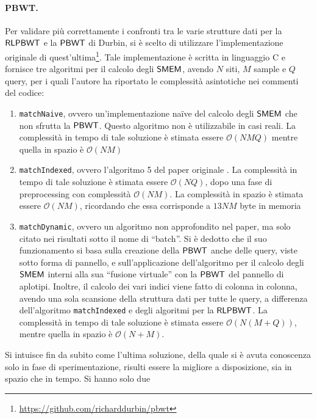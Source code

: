 \paragraph{PBWT.}
Per validare più correttamente i confronti tra le varie strutture dati
per la $\mbox{\rm {\sf RLPBWT}}$ e la $\mbox{\rm {\sf PBWT}}$ di Durbin, si è scelto di utilizzare
l'implementazione originale di
quest'ultima\footnote{\url{https://github.com/richarddurbin/pbwt}}. Tale
implementazione è scritta in 
linguaggio C e
fornisce tre algoritmi per il calcolo degli $\mbox{\rm {\sf SMEM}}$, avendo $N$ siti, $M$ sample
e $Q$ query, per i quali l'autore ha riportato le complessità asintotiche 
nei commenti del codice: 
\begin{enumerate}
  \item \texttt{matchNaive}, ovvero un'implementazione na\"{i}ve del calcolo
  degli $\mbox{\rm {\sf SMEM}}$ che non sfrutta la $\mbox{\rm {\sf PBWT}}$. Questo algoritmo non è
  utilizzabile in casi reali. La complessità in tempo di tale 
  soluzione è stimata essere $\mathcal{O}(\mathit{NMQ})$ mentre quella in spazio
  è 
  $\mathcal{O}(\mathit{NM})$
  \item \texttt{matchIndexed}, ovvero l'algoritmo 5 del paper originale
  \cite{pbwt}. La complessità in tempo di tale 
  soluzione è stimata essere $\mathcal{O}(\mathit{NQ})$, dopo una fase di
  preprocessing 
  con complessità $\mathcal{O}(\mathit{NM})$. La complessità in spazio è stimata
  essere 
  $\mathcal{O}(\mathit{NM})$, ricordando che essa corrisponde a $13\mathit{NM}$
  byte in memoria
  \item \texttt{matchDynamic}, ovvero un algoritmo non approfondito nel paper,
  ma
  solo citato nei risultati sotto il nome di ``batch''.
  Si è dedotto che il suo funzionamento
  si basa sulla creazione della $\mbox{\rm {\sf PBWT}}$ anche delle query, viste 
  sotto forma di pannello, e sull'applicazione dell'algoritmo per il calcolo
  degli $\mbox{\rm {\sf SMEM}}$  
  interni alla sua ``fusione virtuale'' con la $\mbox{\rm {\sf PBWT}}$ del pannello di aplotipi.
  Inoltre, il calcolo dei vari indici viene
  fatto di colonna in colonna, avendo una sola scansione
  della struttura dati per tutte le query, a differenza dell'algoritmo
  \texttt{matchIndexed} e degli algoritmi per la $\mbox{\rm {\sf RLPBWT}}$.
  La complessità in tempo di tale 
  soluzione è stimata essere $\mathcal{O}(N(M+Q))$, mentre quella in spazio è
  $\mathcal{O}(N+M)$. 
\end{enumerate}
Si intuisce fin da subito come l'ultima soluzione, della quale si è avuta
conoscenza solo in fase di
sperimentazione, risulti essere la migliore a disposizione, sia in spazio che
in tempo. Si hanno solo due
